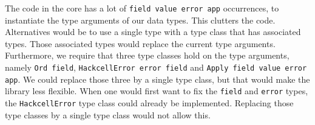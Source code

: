 \documentclass{article}
\begin{document}
	The code in the core has a lot of \texttt{field value error app} occurrences, to instantiate the type arguments of our data types. This clutters the code. Alternatives would be to use a single type with a type class that has associated types. Those associated types would replace the current type arguments. Furthermore, we require that three type classes hold on the type arguments, namely \texttt{Ord field}, \texttt{HackcellError error field} and \texttt{Apply field value error app}. We could replace those three by a single type class, but that would make the library less flexible. When one would first want to fix the \texttt{field} and \texttt{error} types, the \texttt{HackcellError} type class could already be implemented. Replacing those type classes by a single type class would not allow this.
	
	
	
\end{document}

